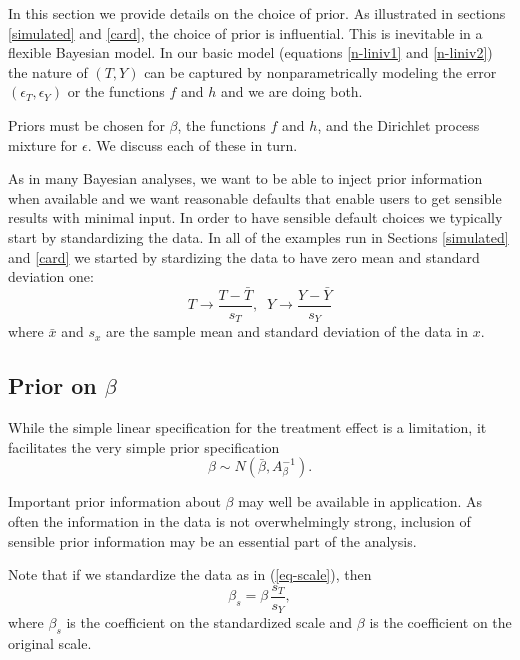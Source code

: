 In this section we provide details on the choice of prior.
As illustrated in sections \ref{simulated} and \ref{card}, the choice of prior is influential.
This is inevitable in a flexible Bayesian model.
In our basic model (equations \ref{n-liniv1} and \ref{n-liniv2}) the nature of $(T,Y)$
can be captured by nonparametrically modeling the error $(\epsilon_T,\epsilon_Y)$ or the functions
$f$ and $h$ and we are doing both.

Priors must be chosen for $\beta$, the functions $f$ and $h$, and the Dirichlet process mixture for
$\epsilon$.  We discuss each of these in turn.

As in many Bayesian analyses, we want to be able to inject prior information when available and we want
reasonable defaults that enable users to get sensible results with minimal input.
In order to have sensible default choices we typically start by standardizing the data.
In all of the examples run in Sections \ref{simulated} and \ref{card} we  started by stardizing the data
to have zero mean and standard deviation one:
\begin{equation}\label{eq-scale}
T \rightarrow \frac{T - \bar{T}}{s_T}, \;\;  Y \rightarrow \frac{Y - \bar{Y}}{s_Y}
\end{equation}
where $\bar{x}$ and $s_x$ are the sample mean and standard deviation of the data in $x$.

\subsection{Prior on $\beta$}\label{subsec:beta-prior}

While the simple linear specification for the treatment effect is a limitation, it facilitates
the very simple prior specification
\begin{equation}\label{eq.beta-prior}
\beta \sim N(\bar{\beta},A_\beta^{-1}).
\end{equation}

Important prior information about $\beta$ may well be available in application.
As often the information in the data is not overwhelmingly strong, inclusion of sensible prior information
may be an essential part of the analysis.

Note that if we standardize the data as in (\ref{eq-scale}), 
then
\begin{equation*}
\beta_s = \beta \, \frac{s_T}{s_Y},
\end{equation*}
where $\beta_s$ is the coefficient on the standardized scale and $\beta$ is the coefficient on the original
scale.

